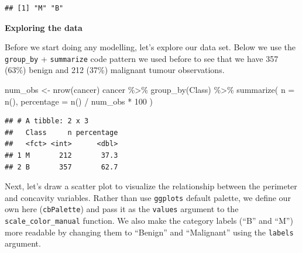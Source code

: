 \documentclass[
]{krantz}
\makeatletter
\newenvironment{Shaded}{\begin{snugshade}}{\end{snugshade}}
\newcommand{\AttributeTok}[1]{\textcolor[rgb]{0.61,0.61,0.61}{#1}}
\newcommand{\DecValTok}[1]{\textcolor[rgb]{0.06,0.06,0.06}{#1}}
\newcommand{\FunctionTok}[1]{\textcolor[rgb]{0,0,0}{#1}}
\newcommand{\NormalTok}[1]{#1}
\newcommand{\OtherTok}[1]{\textcolor[rgb]{0.37,0.37,0.37}{#1}}
\newcommand{\SpecialCharTok}[1]{\textcolor[rgb]{0,0,0}{#1}}
\newenvironment{kframe}{%
\medskip{}
\setlength{\fboxsep}{.8em}
 \def\at@end@of@kframe{}%
 \ifinner\ifhmode%
  \def\at@end@of@kframe{\end{minipage}}%
  \begin{minipage}{\columnwidth}%
 \fi\fi%
 \def\FrameCommand##1{\hskip\@totalleftmargin \hskip-\fboxsep
 \colorbox{shadecolor}{##1}\hskip-\fboxsep
     \hskip-\linewidth \hskip-\@totalleftmargin \hskip\columnwidth}%
 \MakeFramed {\advance\hsize-\width
   \@totalleftmargin\z@ \linewidth\hsize
   \@setminipage}}%
 {\par\unskip\endMakeFramed%
 \at@end@of@kframe}
\renewenvironment{Shaded}{\begin{kframe}}{\end{kframe}}
\makeatother
\begin{document}
\begin{verbatim}
## [1] "M" "B"
\end{verbatim}

\textbf{Exploring the data}

Before we start doing any modelling, let's explore our data set. Below we use
the \texttt{group\_by} + \texttt{summarize} code pattern we used before to see that we have
357 (63\%) benign and 212 (37\%) malignant tumour observations.

\begin{Shaded}
\begin{Highlighting}[]
\NormalTok{num\_obs }\OtherTok{\textless{}{-}} \FunctionTok{nrow}\NormalTok{(cancer)}
\NormalTok{cancer }\SpecialCharTok{\%\textgreater{}\%}
  \FunctionTok{group\_by}\NormalTok{(Class) }\SpecialCharTok{\%\textgreater{}\%}
  \FunctionTok{summarize}\NormalTok{(}
    \AttributeTok{n =} \FunctionTok{n}\NormalTok{(),}
    \AttributeTok{percentage =} \FunctionTok{n}\NormalTok{() }\SpecialCharTok{/}\NormalTok{ num\_obs }\SpecialCharTok{*} \DecValTok{100}
\NormalTok{  )}
\end{Highlighting}
\end{Shaded}

\begin{verbatim}
## # A tibble: 2 x 3
##   Class     n percentage
##   <fct> <int>      <dbl>
## 1 M       212       37.3
## 2 B       357       62.7
\end{verbatim}

Next, let's draw a scatter plot to visualize the relationship between the
perimeter and concavity variables. Rather than use \texttt{ggplot\textquotesingle{}s} default palette,
we define our own here (\texttt{cbPalette}) and pass it as the \texttt{values} argument to
the \texttt{scale\_color\_manual} function. We also make the category labels (``B'' and
``M'') more readable by changing them to ``Benign'' and ``Malignant'' using the
\texttt{labels} argument.
\end{document}
